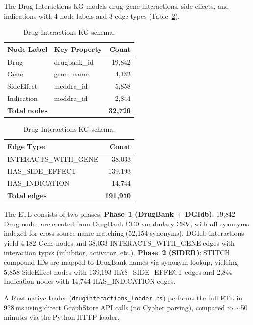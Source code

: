 \documentclass[11pt]{article}
\begin{document}
The Drug Interactions KG models drug--gene interactions, side effects, and indications with 4 node labels and 3 edge types (Table~\ref{tab:drug-schema}).

\begin{table}[H]
\centering
\caption{Drug Interactions KG schema.}
\label{tab:drug-schema}
\small
\begin{tabular}{llr}
\toprule
\textbf{Node Label} & \textbf{Key Property} & \textbf{Count} \\
\midrule
Drug & drugbank\_id & 19,842 \\
Gene & gene\_name & 4,182 \\
SideEffect & meddra\_id & 5,858 \\
Indication & meddra\_id & 2,844 \\
\midrule
\multicolumn{2}{l}{\textbf{Total nodes}} & \textbf{32,726} \\
\bottomrule
\end{tabular}
\quad
\begin{tabular}{lr}
\toprule
\textbf{Edge Type} & \textbf{Count} \\
\midrule
INTERACTS\_WITH\_GENE & 38,033 \\
HAS\_SIDE\_EFFECT & 139,193 \\
HAS\_INDICATION & 14,744 \\
\midrule
\textbf{Total edges} & \textbf{191,970} \\
\bottomrule
\end{tabular}
\end{table}

The ETL consists of two phases. \textbf{Phase~1 (DrugBank + DGIdb)}: 19,842 Drug nodes are created from DrugBank CC0 vocabulary CSV, with all synonyms indexed for cross-source name matching (52,154 synonyms). DGIdb interactions yield 4,182 Gene nodes and 38,033 INTERACTS\_WITH\_GENE edges with interaction types (inhibitor, activator, etc.). \textbf{Phase~2 (SIDER)}: STITCH compound IDs are mapped to DrugBank names via synonym lookup, yielding 5,858 SideEffect nodes with 139,193 HAS\_SIDE\_EFFECT edges and 2,844 Indication nodes with 14,744 HAS\_INDICATION edges.

A Rust native loader (\texttt{druginteractions\_loader.rs}) performs the full ETL in 928\,ms using direct GraphStore API calls (no Cypher parsing), compared to ${\sim}$50 minutes via the Python HTTP loader.

\end{document}
